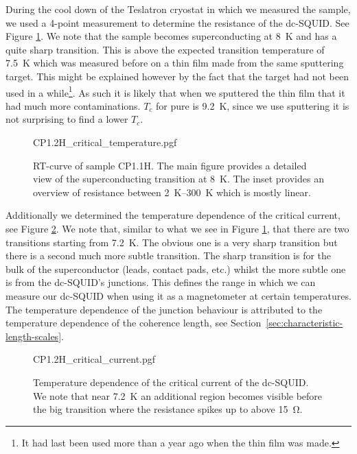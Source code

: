 During the cool down of the Teslatron cryostat in which we measured the sample, we used a 4-point measurement to determine the resistance of the dc-SQUID. See Figure \ref{fig:CP1.1H-SQUID-RT}. We note that the sample becomes superconducting at \qty{8}{\kelvin} and has a quite sharp transition. This is above the expected transition temperature of \qty{7.5}{\kelvin} which was measured before on a thin film made from the same sputtering target. This might be explained however by the fact that the  target had not been used in a while\footnote{It had last been used more than a year ago when the thin film was made.}. As such it is likely that when we sputtered the thin film that it had much more contaminations. $T_c$ for pure  is \qty{9.2}{\kelvin}\cite{maxfieldSuperconductingPenetrationDepth1965}, since we use sputtering it is not surprising to find a lower $T_c$.

\begin{figure}[ht!]
	\centering
	{CP1.2H_critical_temperature.pgf}
	\caption{
		RT-curve of sample CP1.1H. The main figure provides a detailed view of the superconducting transition at \qty{8}{\kelvin}. The inset provides an overview of resistance between \qtyrange{2}{300}{\kelvin} which is mostly linear.
	}
	\label{fig:CP1.1H-SQUID-RT}
\end{figure}

Additionally we determined the temperature dependence of the critical current, see Figure \ref{fig:CP1.1H-SQUID-critical-current-temperature-dependence}. We note that, similar to what we see in Figure \ref{fig:CP1.1H-SQUID-RT}, that there are two transitions starting from \qty{7.2}{\kelvin}. The obvious one is a very sharp transition but there is a second much more subtle transition. The sharp transition is for the bulk of the superconductor (leads, contact pads, etc.) whilst the more subtle one is from the dc-SQUID's junctions. This defines the range in which we can measure our dc-SQUID when using it as a magnetometer at certain temperatures. The temperature dependence of the junction behaviour is attributed to the temperature dependence of the coherence length, see Section~\ref{sec:characteristic-length-scales}.

\begin{figure}[ht!]
	\centering
	{CP1.2H_critical_current.pgf}
	\caption{Temperature dependence of the critical current of the dc-SQUID. We note that near \qty{7.2}{\kelvin} an additional region becomes visible before the big transition where the resistance spikes up to above \qty{15}{\ohm}.}
	\label{fig:CP1.1H-SQUID-critical-current-temperature-dependence}
\end{figure}

